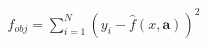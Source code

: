 \documentclass[preview]{standalone}
\begin{document}
\begin{align*}
f_{obj} = \sum_{i=1}^N \left(y_i - \hat{f}(x,\mathbf{a})\right)^2
\end{align*}
\end{document}
